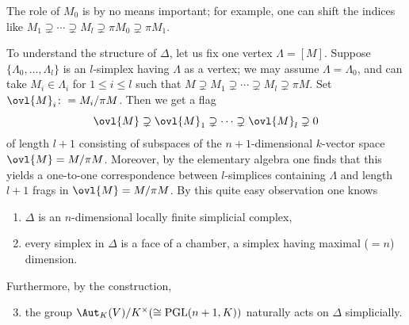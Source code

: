 The role of $M_0$ is by no means important; for example, one can shift
the indices like
$M_1\supsetneq\cdots\supsetneq M_l\supsetneq\pi M_0\supsetneq\pi M_1$.

To understand the structure of $\Delta$, let us fix one vertex
$\Lambda=[M]$. 
Suppose $\{\Lambda_0,\ldots,\Lambda_l\}$ is an $l$-simplex having
$\Lambda$ as a vertex; we may assume $\Lambda=\Lambda_0$, and can take
$M_i\in\Lambda_i$ for $1\leq i\leq l$ such that 
$M\supsetneq M_1\supsetneq\cdots\supsetneq M_l\supsetneq\pi M$.
Set $\ovl{M}_i\colon=M_i/\pi M$.
Then we get a flag 
$$
\ovl{M}\supsetneq\ovl{M}_1\supsetneq\cdots\supsetneq\ovl{M}_l\supsetneq 0
$$
of length $l+1$ consisting of subspaces of the $n+1$-dimensional
$k$-vector space $\ovl{M}=M/\pi M$.
Moreover, by the elementary algebra one finds that this yields a
one-to-one correspondence between $l$-simplices containing $\Lambda$ and 
length $l+1$ frags in $\ovl{M}=M/\pi M$.
By this quite easy observation one knows
\begin{enumerate}
\item $\Delta$ is an $n$-dimensional locally finite simplicial complex,
\item every simplex in $\Delta$ is a face of a chamber, a simplex having 
      maximal ($=n$) dimension.
\end{enumerate}
Furthermore, by the construction,
\begin{enumerate}
\setcounter{enumi}{2}
\item the group $\Aut_K(V)/K^{\times}(\cong\mathrm{PGL}(n+1,K))$
      naturally acts on $\Delta$ simplicially.
\end{enumerate}

